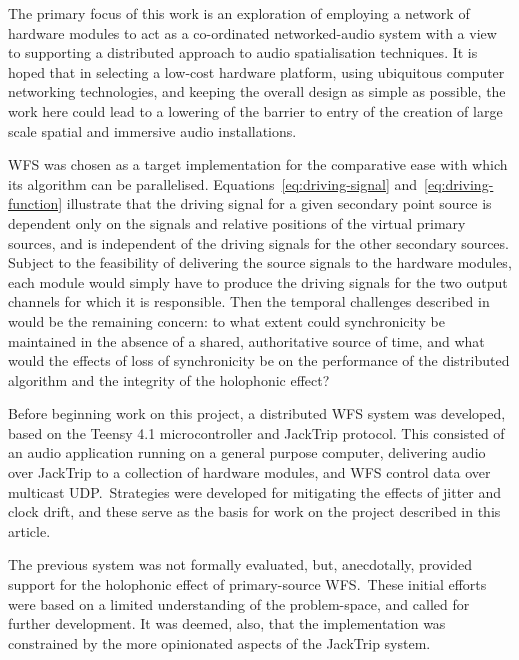 The primary focus of this work is an exploration of employing a network of
hardware modules to act as a co-ordinated networked-audio system with a view to
supporting a distributed approach to audio spatialisation techniques.
It is hoped that in selecting a low-cost hardware platform, using ubiquitous
computer networking technologies, and keeping the overall design as simple as
possible, the work here could lead to a lowering of the barrier to entry of
the creation of large scale spatial and immersive audio installations.

WFS was chosen as a target implementation for the comparative ease with which
its algorithm can be parallelised.
Equations~\eqref{eq:driving-signal} and~\eqref{eq:driving-function} illustrate
that the driving signal for a given secondary point source is dependent only
on the signals and relative positions of the virtual primary sources, and is
independent of the driving signals for the other secondary sources.
Subject to the feasibility of delivering the source signals to the hardware
modules, each module would simply have to produce the driving signals for the
two output channels for which it is responsible.
Then the temporal challenges described in  would
be the remaining concern: to what extent could synchronicity be maintained
in the absence of a shared, authoritative source of time, and what would the
effects of loss of synchronicity be on the performance of the distributed
algorithm and the integrity of the holophonic effect?

Before beginning work on this project, a distributed WFS system was
developed, based on the Teensy 4.1 microcontroller and JackTrip protocol.
This consisted of an audio application running on a general purpose computer,
delivering audio over JackTrip to a collection of hardware modules, and
WFS control data over multicast UDP.\
Strategies were developed for mitigating the effects of jitter and clock drift,
and these serve as the basis for work on the project described in this article.

The previous system was not formally evaluated, but, anecdotally, provided
support for the holophonic effect of primary-source WFS.\
These initial efforts were based on a limited understanding of the
problem-space, and called for further development.
It was deemed, also, that the implementation was constrained by the more
opinionated aspects of the JackTrip system.
